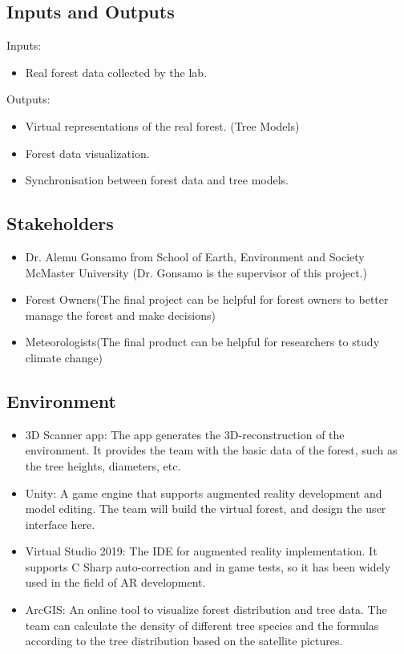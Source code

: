 \documentclass{article}
\begin{document}
\subsection{Inputs and Outputs}

Inputs:
\begin{itemize}
    \item Real forest data collected by the lab.
\end{itemize}
Outputs:
\begin{itemize}
\item Virtual representations of the real forest. (Tree
Models)
\item Forest data visualization. 
\item Synchronisation between forest data and tree models.
\end{itemize}

\subsection{Stakeholders}
\begin{itemize}
    \item Dr. Alemu Gonsamo from School of Earth,
    Environment and Society McMaster University (Dr.
    Gonsamo is the supervisor of this project.)
    \item Forest Owners(The final project can be helpful
    for forest owners to better manage the 
    forest and make decisions)
    \item Meteorologists(The final product can be helpful 
    for researchers to study climate change)
\end{itemize}

\subsection{Environment}
\begin{itemize}
    \item 3D Scanner app: The app generates the 3D-reconstruction of the environment. It provides the team with the basic data of the forest, such as the tree heights, diameters, etc.
    \item Unity: A game engine that supports augmented reality development and model editing. The team will build the virtual forest, and design the user interface here.
    \item Virtual Studio 2019: The IDE for augmented reality implementation. It supports C Sharp auto-correction and in game tests, so it has been widely used in the field of AR development.
    \item ArcGIS: An online tool to visualize forest distribution and tree data. The team can calculate the density of different tree species and the formulas according to the tree distribution based on the satellite pictures.
\end{itemize}
\end{document}
